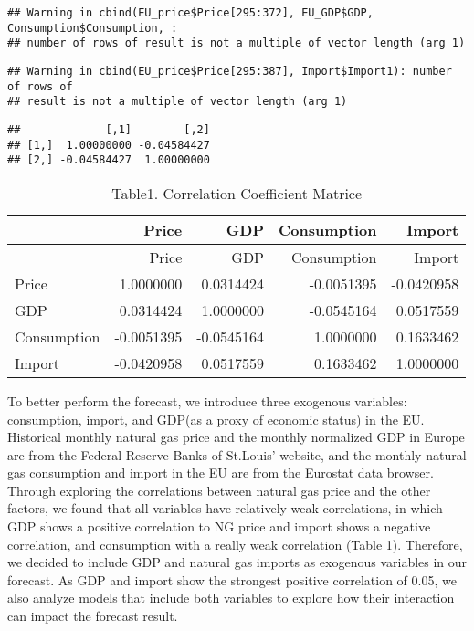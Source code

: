 \documentclass[
]{article}
\begin{document}
\begin{verbatim}
## Warning in cbind(EU_price$Price[295:372], EU_GDP$GDP, Consumption$Consumption, :
## number of rows of result is not a multiple of vector length (arg 1)
\end{verbatim}

\begin{verbatim}
## Warning in cbind(EU_price$Price[295:387], Import$Import1): number of rows of
## result is not a multiple of vector length (arg 1)
\end{verbatim}

\begin{verbatim}
##             [,1]        [,2]
## [1,]  1.00000000 -0.04584427
## [2,] -0.04584427  1.00000000
\end{verbatim}

\begin{longtable}[]{@{}lrrrr@{}}
\caption{Table1. Correlation Coefficient Matrice}\tabularnewline
\toprule
& Price & GDP & Consumption & Import \\
\midrule
\endfirsthead
\toprule
& Price & GDP & Consumption & Import \\
\midrule
\endhead
Price & 1.0000000 & 0.0314424 & -0.0051395 & -0.0420958 \\
GDP & 0.0314424 & 1.0000000 & -0.0545164 & 0.0517559 \\
Consumption & -0.0051395 & -0.0545164 & 1.0000000 & 0.1633462 \\
Import & -0.0420958 & 0.0517559 & 0.1633462 & 1.0000000 \\
\bottomrule
\end{longtable}

To better perform the forecast, we introduce three exogenous variables:
consumption, import, and GDP(as a proxy of economic status) in the EU.
Historical monthly natural gas price and the monthly normalized GDP in
Europe are from the Federal Reserve Banks of St.Louis' website, and the
monthly natural gas consumption and import in the EU are from the
Eurostat data browser. Through exploring the correlations between
natural gas price and the other factors, we found that all variables
have relatively weak correlations, in which GDP shows a positive
correlation to NG price and import shows a negative correlation, and
consumption with a really weak correlation (Table 1). Therefore, we
decided to include GDP and natural gas imports as exogenous variables in
our forecast. As GDP and import show the strongest positive correlation
of 0.05, we also analyze models that include both variables to explore
how their interaction can impact the forecast result.
\end{document}
